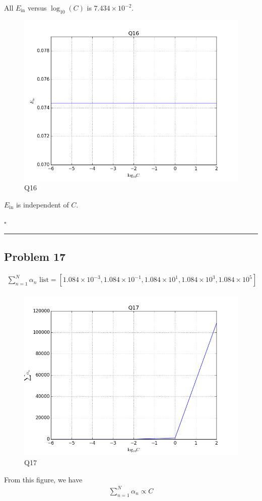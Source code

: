 \documentclass[12pt]{article}
\newcommand*{\QEDB}{\hfill\ensuremath{\square}}
\newcommand{\SBrackets}[1]{\left[#1\right]}
\newcommand{\ParTh}[1]{\left(#1\right)}
\newcommand{\SciNum}[2]{#1\times{10}^{#2}}
\newcommand{\horrule}[1]{\rule{\linewidth}{#1}}
\begin{document}
All $E_{\text{in}}$ versus $\log_{10}\ParTh{C}$ is $\SciNum{7.434}{-2}$.
\begin{figure}[H]
	\centering
	\includegraphics[scale=0.5]{Q16.png}
	\caption{Q16}
	\label{Q16}
\end{figure}
$E_{\text{in}}$ is independent of $C$.

\QEDB

\horrule{0.5pt}

\subsection*{Problem 17}

\begin{align}
\sum_{n=1}^{N}\alpha_n\text{ list}=\SBrackets{\SciNum{1.084}{-3}, \SciNum{1.084}{-1}, \SciNum{1.084}{1}, \SciNum{1.084}{3}, \SciNum{1.084}{5}}
\end{align}
\begin{figure}[H]
	\centering
	\includegraphics[scale=0.5]{Q17.png}
	\caption{Q17}
	\label{Q17}
\end{figure}
From this figure, we have
\begin{align}
\sum_{n=1}^{N}\alpha_n\propto C
\end{align}
\end{document}

